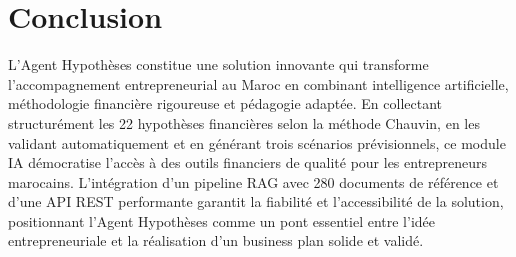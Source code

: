 \documentclass[12pt, a4paper]{report}
\begin{document}
\section{Conclusion}

L'Agent Hypothèses constitue une solution innovante qui transforme l'accompagnement entrepreneurial au Maroc en combinant intelligence artificielle, méthodologie financière rigoureuse et pédagogie adaptée. En collectant structurément les 22 hypothèses financières selon la méthode Chauvin, en les validant automatiquement et en générant trois scénarios prévisionnels, ce module IA démocratise l'accès à des outils financiers de qualité pour les entrepreneurs marocains. L'intégration d'un pipeline RAG avec 280 documents de référence et d'une API REST performante garantit la fiabilité et l'accessibilité de la solution, positionnant l'Agent Hypothèses comme un pont essentiel entre l'idée entrepreneuriale et la réalisation d'un business plan solide et validé.
\end{document}
